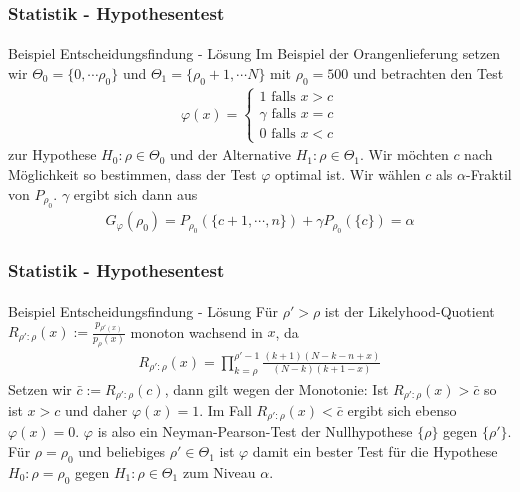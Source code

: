 \documentclass{beamer}
\begin{document}
\begin{frame}
    \frametitle{Statistik - Hypothesentest}
\framesubtitle{}


\begin{block}{Beispiel Entscheidungsfindung - Lösung}
Im Beispiel der Orangenlieferung  setzen wir $\Theta_0 = \{ 0, \cdots \rho_0 \}$ und $\Theta_1 = \{\rho_0 +1 , \cdots N \}$ mit $\rho_0 = 500$ und betrachten den Test
\begin{align*}
 \varphi(x) = \begin{cases} 1 \text{ falls } x > c \\  \gamma  \text{ falls } x = c \\ 0 \text{ falls } x < c  \end{cases}
\end{align*}
zur Hypothese $H_0: \rho \in \Theta_0$ und der Alternative $H_1: \rho \in \Theta_1$.
Wir möchten $c$ nach Möglichkeit  so bestimmen, dass der Test $\varphi$ optimal ist. Wir wählen  $c$ als $\alpha$-Fraktil von $P_{\rho_0}$.  $\gamma$ ergibt sich dann aus
\begin{align*}
G_{\varphi}(\rho_0) = P_{\rho_0} (\{ c+1, \cdots, n \}) + \gamma  P_{\rho_0}(\{ c\}) = \alpha 
\end{align*}
\end{block}

 \end{frame}


\begin{frame}
    \frametitle{Statistik - Hypothesentest}
\framesubtitle{}

\begin{block}{Beispiel Entscheidungsfindung - Lösung}
Für $\rho' > \rho$ ist der Likelyhood-Quotient  $R_{\rho' : \rho} (x):= \frac{p_{\rho' (x)}}{p_{\rho}(x)}$ monoton wachsend in $x$, da
\begin{align*}
R_{\rho' : \rho} (x)= \prod_{k = \rho}^{\rho'-1} \frac{(k+1)(N -k -n +x)}{(N-k) (k+1 -x)}
\end{align*}
Setzen wir  $\bar{c}:= R_{\rho' : \rho} (c)$, dann gilt wegen der Monotonie: Ist $R_{\rho' : \rho} (x) > \bar{c}$ so ist $ x >c$ und daher $\varphi(x) = 1$. Im Fall  $R_{\rho' : \rho} (x) < \bar{c}$ ergibt sich ebenso $\varphi(x) = 0$. $\varphi$ is also ein Neyman-Pearson-Test der Nullhypothese $\{\rho\}$ gegen $\{\rho' \}$. Für $\rho = \rho_0$ und beliebiges $\rho' \in \Theta_1$ ist $\varphi$ damit ein bester Test für die Hypothese $H_0: \rho = \rho_0$ gegen  $H_1: \rho \in  \Theta_1$ zum Niveau $\alpha$.

\end{block}

 \end{frame}
\end{document}
